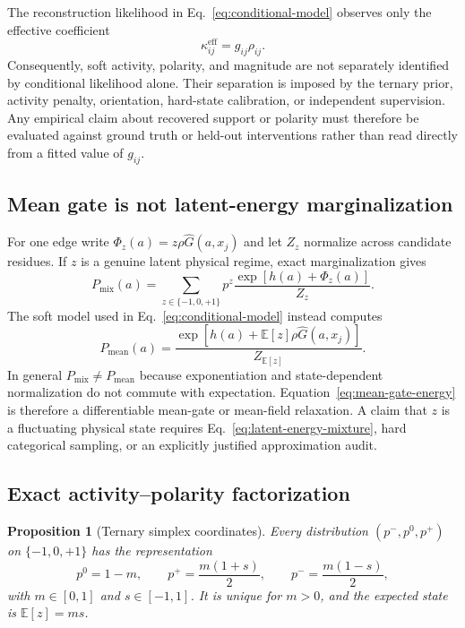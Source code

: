 \documentclass[10pt,twocolumn]{article}
\newcommand{\E}{\mathbb E}
\newcommand{\1}{\mathbf 1}
\newtheorem{proposition}{Proposition}
\theoremstyle{remark}
\begin{document}
The reconstruction likelihood in Eq.~\ref{eq:conditional-model} observes only the effective
coefficient
\begin{equation}
\kappa_{ij}^{\mathrm{eff}}=g_{ij}\rho_{ij}.
\label{eq:effective-coefficient}
\end{equation}
Consequently, soft activity, polarity, and magnitude are not separately identified by conditional
likelihood alone.  Their separation is imposed by the ternary prior, activity penalty, orientation,
hard-state calibration, or independent supervision.  Any empirical claim about recovered support
or polarity must therefore be evaluated against ground truth or held-out interventions rather than
read directly from a fitted value of $g_{ij}$.

\subsection{Mean gate is not latent-energy marginalization}

For one edge write $\Phi_z(a)=z\rho\widehat G(a,x_j)$ and let $Z_z$ normalize across candidate
residues.  If $z$ is a genuine latent physical regime, exact marginalization gives
\begin{equation}
P_{\mathrm{mix}}(a)
=\sum_{z\in\{-1,0,+1\}}p^z
\frac{\exp[h(a)+\Phi_z(a)]}{Z_z}.
\label{eq:latent-energy-mixture}
\end{equation}
The soft model used in Eq.~\ref{eq:conditional-model} instead computes
\begin{equation}
P_{\mathrm{mean}}(a)
=\frac{\exp[h(a)+\E[z]\rho\widehat G(a,x_j)]}
{Z_{\E[z]}}.
\label{eq:mean-gate-energy}
\end{equation}
In general $P_{\mathrm{mix}}\ne P_{\mathrm{mean}}$ because exponentiation and state-dependent
normalization do not commute with expectation.  Equation~\ref{eq:mean-gate-energy} is therefore a
differentiable mean-gate or mean-field relaxation.  A claim that $z$ is a fluctuating physical
state requires Eq.~\ref{eq:latent-energy-mixture}, hard categorical sampling, or an explicitly
justified approximation audit.

\subsection{Exact activity--polarity factorization}

\begin{proposition}[Ternary simplex coordinates]
Every distribution $(p^-,p^0,p^+)$ on $\{-1,0,+1\}$ has the representation
\begin{equation}
p^0=1-m,\qquad
p^+=\frac{m(1+s)}{2},\qquad
p^-=\frac{m(1-s)}{2},
\label{eq:simplex-factorization}
\end{equation}
with $m\in[0,1]$ and $s\in[-1,1]$.  It is unique for $m>0$, and the expected state is
$\E[z]=ms$.
\end{proposition}
\end{document}

